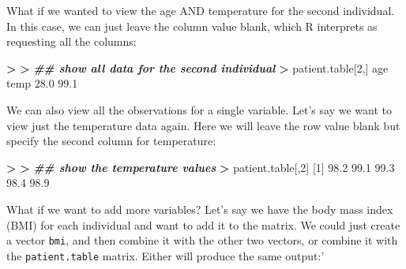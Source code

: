 \documentclass[
]{book}
\newenvironment{Shaded}{\begin{snugshade}}{\end{snugshade}}
\newcommand{\DecValTok}[1]{\textcolor[rgb]{0.00,0.00,0.81}{#1}}
\newcommand{\DocumentationTok}[1]{\textcolor[rgb]{0.56,0.35,0.01}{\textbf{\textit{#1}}}}
\newcommand{\ErrorTok}[1]{\textcolor[rgb]{0.64,0.00,0.00}{\textbf{#1}}}
\newcommand{\FloatTok}[1]{\textcolor[rgb]{0.00,0.00,0.81}{#1}}
\newcommand{\NormalTok}[1]{#1}
\newcommand{\SpecialCharTok}[1]{\textcolor[rgb]{0.81,0.36,0.00}{\textbf{#1}}}
\begin{document}
What if we wanted to view the age AND temperature for the second individual. In this case, we can just leave the column value blank, which R interprets as requesting all the columns:

\begin{Shaded}
\begin{Highlighting}[]
\SpecialCharTok{\textgreater{}} 
\ErrorTok{\textgreater{}} \DocumentationTok{\#\# show all data for the second individual}
\ErrorTok{\textgreater{}}\NormalTok{ patient.table[}\DecValTok{2}\NormalTok{,]}
\NormalTok{ age temp }
\FloatTok{28.0} \FloatTok{99.1} 
\end{Highlighting}
\end{Shaded}

We can also view all the observations for a single variable. Let's say we want to view just the temperature data again. Here we will leave the row value blank but specify the second column for temperature:

\begin{Shaded}
\begin{Highlighting}[]
\SpecialCharTok{\textgreater{}} 
\ErrorTok{\textgreater{}} \DocumentationTok{\#\# show the temperature values}
\ErrorTok{\textgreater{}}\NormalTok{ patient.table[,}\DecValTok{2}\NormalTok{]}
\NormalTok{[}\DecValTok{1}\NormalTok{] }\FloatTok{98.2} \FloatTok{99.1} \FloatTok{99.3} \FloatTok{98.4} \FloatTok{98.9}
\end{Highlighting}
\end{Shaded}

What if we want to add more variables? Let's say we have the body mass index (BMI) for each individual and want to add it to the matrix. We could just create a vector \texttt{bmi}, and then combine it with the other two vectors, or combine it with the \texttt{patient.table} matrix. Either will produce the same output:'
\end{document}
